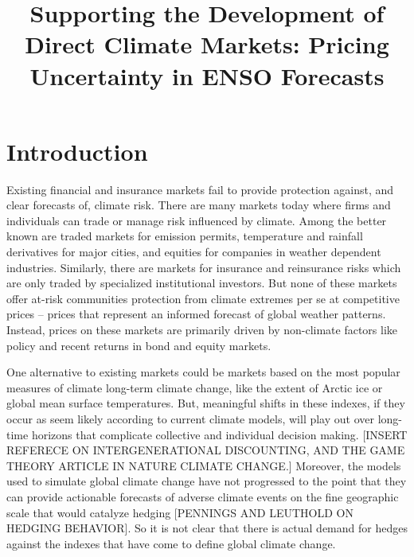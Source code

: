 \documentclass[authoryear]{article}
\begin{document}
\title{Supporting the Development of Direct Climate Markets: Pricing Uncertainty in ENSO Forecasts}
\date{}  %
%
%
%
%
%


\maketitle%


\section{Introduction}
Existing financial and insurance markets fail to provide protection against, and clear forecasts of, climate risk. There are many markets today where firms and individuals can trade or manage risk influenced by climate. Among the better known  are traded markets for emission permits, temperature and rainfall derivatives for major cities, and equities for companies in weather dependent industries. Similarly, there are markets for insurance and reinsurance risks which are only traded by specialized institutional investors. But none of these markets offer at-risk communities protection from climate extremes per se at competitive prices – prices that represent an informed forecast of global weather patterns. Instead, prices on these markets are primarily driven by non-climate factors like policy and recent returns in bond and equity markets. \cite{econ2013ETS}

One alternative to existing markets could be markets based on the most popular measures of climate long-term climate change, like the extent of Arctic ice or global mean surface temperatures. But, meaningful shifts in these indexes, if they occur as seem likely according to current climate models, will play out over long-time horizons that complicate collective and individual decision making. [INSERT REFERECE ON INTERGENERATIONAL DISCOUNTING, AND THE GAME THEORY ARTICLE IN NATURE CLIMATE CHANGE.] Moreover, the models used to simulate global climate change have not progressed to the point that they can provide actionable forecasts of adverse climate events on the fine geographic scale that would catalyze hedging [PENNINGS AND LEUTHOLD ON HEDGING BEHAVIOR]. So it is not clear that there is actual demand for hedges against the indexes that have come to define global climate change.
\end{document}
